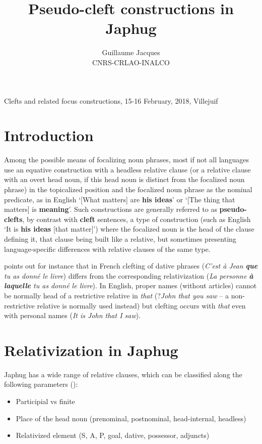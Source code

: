 \documentclass[oneside,a4paper,11pt]{article}
\begin{document}
 
\title{Pseudo-cleft constructions in Japhug}
\author{Guillaume Jacques\\ CNRS-CRLAO-INALCO}
\date{}
\maketitle
Clefts and related focus constructions, 15-16 February, 2018, Villejuif
\section*{Introduction}
Among the possible means of focalizing noun phrases, most if not all languages use an equative construction with a headless relative clause (or a relative clause with an overt head noun, if this head noun is distinct from the focalized noun phrase) in the topicalized position and the focalized noun phrase as the nominal predicate, as in English `[What matters] are \textbf{his ideas}' or `[The thing that matters] is \textbf{meaning}'.
Such constructions are generally referred to as \textbf{pseudo-clefts}, by contrast with \textbf{cleft} sentences, a type of construction (such as English `It is \textbf{his ideas} [that matter]') where the focalized noun is the head of the clause defining it, that clause being built like a relative, but sometimes presenting language-specific differences with relative clauses of the same type. 

\citet[123-4]{creissels06sgit2} points out for instance that in French clefting of dative phrases (\textit{C'est à Jean \textbf{que} tu as donné le livre}) differs from the corresponding relativization (\textit{La personne \textbf{à laquelle} tu as donné le livre}). In English, proper names (without articles) cannot be normally head of a restrictive relative in \textit{that} (?\textit{John that you saw} -- a non-restrictive relative is normally used instead) but clefting occurs with \textit{that} even with personal names (\textit{It is John that I saw}).  
 

\section{Relativization in Japhug} \label{sec:relatives}
Japhug has a wide range of relative clauses, which can be classified along the following parameters (\citealt{jacques16relatives}):

\begin{itemize}
\item Participial vs finite
\item Place of the head noun (prenominal, postnominal, head-internal, headless)
\item Relativized element (S, A, P, goal, dative, possessor, adjuncts)
\end{itemize}
 
\end{document}
